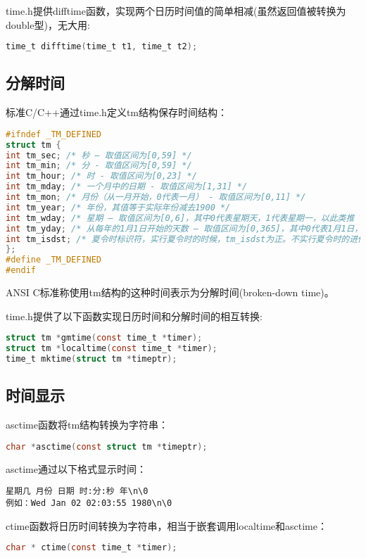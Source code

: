 time.h提供difftime函数，实现两个日历时间值的简单相减(虽然返回值被转换为double型)，无大用:
\begin{lstlisting}[language=C]
time_t difftime(time_t t1, time_t t2); 
\end{lstlisting}


\subsection{分解时间}

标准C/C++通过time.h定义tm结构保存时间结构： 
\begin{lstlisting}[language=C]
#ifndef _TM_DEFINED 
struct tm { 
int tm_sec; /* 秒 – 取值区间为[0,59] */ 
int tm_min; /* 分 - 取值区间为[0,59] */ 
int tm_hour; /* 时 - 取值区间为[0,23] */ 
int tm_mday; /* 一个月中的日期 - 取值区间为[1,31] */ 
int tm_mon; /* 月份（从一月开始，0代表一月） - 取值区间为[0,11] */ 
int tm_year; /* 年份，其值等于实际年份减去1900 */ 
int tm_wday; /* 星期 – 取值区间为[0,6]，其中0代表星期天，1代表星期一，以此类推 */
int tm_yday; /* 从每年的1月1日开始的天数 – 取值区间为[0,365]，其中0代表1月1日，1代表1月2日，以此类推 */ 
int tm_isdst; /* 夏令时标识符，实行夏令时的时候，tm_isdst为正。不实行夏令时的进候，tm_isdst为0；不了解情况时，tm_isdst()为负。*/ 
}; 
#define _TM_DEFINED 
#endif 
\end{lstlisting}

ANSI C标准称使用tm结构的这种时间表示为分解时间(broken-down time)。

time.h提供了以下函数实现日历时间和分解时间的相互转换: 
\begin{lstlisting}[language=C]
struct tm *gmtime(const time_t *timer); 
struct tm *localtime(const time_t *timer); 
time_t mktime(struct tm *timeptr); 
\end{lstlisting}

\subsection{时间显示}
asctime函数将tm结构转换为字符串：
\begin{lstlisting}[language=C]
char *asctime(const struct tm *timeptr);
\end{lstlisting}

asctime通过以下格式显示时间：
\begin{verbatim}
星期几 月份 日期 时:分:秒 年\n\0 
例如：Wed Jan 02 02:03:55 1980\n\0 
\end{verbatim}

ctime函数将日历时间转换为字符串，相当于嵌套调用localtime和asctime：
\begin{lstlisting}[language=C]
char * ctime(const time_t *timer); 
\end{lstlisting}


